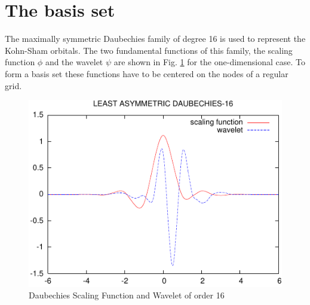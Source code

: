 \documentclass[a4paper,11pt]{report}
\begin{document}
\section{The basis set}
The maximally symmetric Daubechies family of degree 16 is used to represent 
the Kohn-Sham orbitals. The two fundamental functions of this family, 
the scaling function $\phi$ and the wavelet $\psi$ are shown in Fig. \ref{sym_16} 
for the one-dimensional case.
To form a basis set these functions have to be centered on the nodes of a regular grid.
\begin{figure}[ht]
\begin{center}
\includegraphics[width=\textwidth]{sym_16.pdf}
\end{center}
\label{sym_16}
\caption{Daubechies Scaling Function and Wavelet of order 16}
\end{figure}
\end{document}
